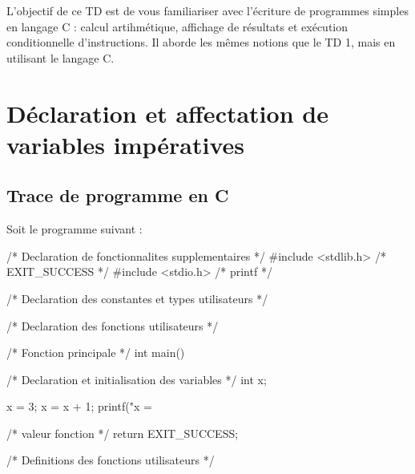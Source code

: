 
\newcommand{\commentaire}[1]{}


L'objectif de ce TD est de vous familiariser avec l'écriture de programmes simples en langage C : calcul artihmétique, affichage de résultats et exécution conditionnelle d'instructions. Il aborde les mêmes notions que le TD 1, mais en utilisant le langage C.



\section{Déclaration et affectation de variables impératives}

\subsection{Trace de programme en C}

Soit le programme suivant :
\begin{listing}{1}
/* Declaration de fonctionnalites supplementaires */
#include <stdlib.h> /* EXIT_SUCCESS */
#include <stdio.h> /* printf */

/* Declaration des constantes et types utilisateurs */

/* Declaration des fonctions utilisateurs */

/* Fonction principale */
int main()
{
    /* Declaration et initialisation des variables */
    int x;

    x = 3;
    x = x + 1;
    printf("x = %

    /* valeur fonction */
    return EXIT_SUCCESS;
}

/* Definitions des fonctions utilisateurs */
  
\end{listing}

